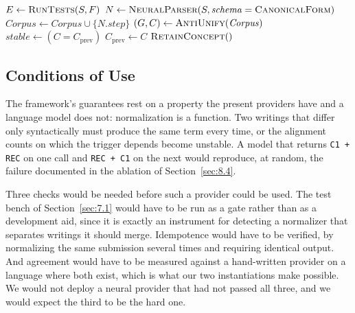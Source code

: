 \documentclass[journal]{IEEEtran}
\begin{document}
\begin{algorithm}[t]
\SetAlgoLined
\DontPrintSemicolon
\footnotesize
{}
$E \leftarrow \textsc{RunTests}(S, F)$\;
$N \leftarrow \textsc{NeuralParser}(S, \mathit{schema} = \textsc{CanonicalForm})$\;
$\mathit{Corpus} \leftarrow \mathit{Corpus} \cup \{N.\mathit{step}\}$\;
$(G, C) \leftarrow \textsc{AntiUnify}(\mathit{Corpus})$\;
$\mathit{stable} \leftarrow (C = C_{\mathrm{prev}})$\;
{$C_{\mathrm{prev}} \leftarrow C$\; \Return $\textsc{RetainConcept}()$\;}
\caption{Ingestion loop of the projected hybrid architecture. Only the parsing
step is generative; every decision below it is computed. The algorithm has not
been implemented.}
\end{algorithm}

\subsection{Conditions of Use}\label{sec:10.2}
The framework's guarantees rest on a property the present providers have and a language model does not: normalization is a function. Two writings that differ only syntactically must produce the same term every time, or the alignment counts on which the trigger depends become unstable. A model that returns \texttt{C1 + REC} on one call and \texttt{REC + C1} on the next would reproduce, at random, the failure documented in the ablation of Section~\ref{sec:8.4}.

Three checks would be needed before such a provider could be used. The test bench of Section~\ref{sec:7.1} would have to be run as a gate rather than as a development aid, since it is exactly an instrument for detecting a normalizer that separates writings it should merge. Idempotence would have to be verified, by normalizing the same submission several times and requiring identical output. And agreement would have to be measured against a hand-written provider on a language where both exist, which is what our two instantiations make possible. We would not deploy a neural provider that had not passed all three, and we would expect the third to be the hard one.
\end{document}
